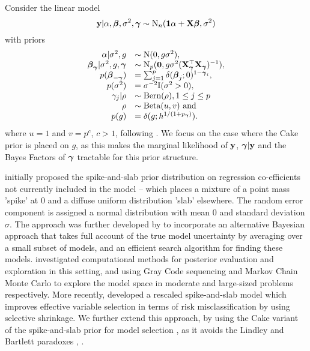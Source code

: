Consider the linear model
$$
	{\bf y} | \alpha, {\boldsymbol \beta}, \sigma^2, {\boldsymbol \gamma} \sim \text{N}_n({\bf 1} \alpha + {\bf X} {\boldsymbol \beta}, \sigma^2)
$$
with priors
$$
\begin{array}{rl}
	\alpha | \sigma^2, g &\sim \text{N}(0, g \sigma^2), \\
	{\boldsymbol \beta}_{\boldsymbol \gamma} | \sigma^2, g, {\boldsymbol \gamma} &\sim \text{N}_p({\bf 0}, g \sigma^2 ({\bf X}_{\boldsymbol \gamma}^\top {\bf X}_{\boldsymbol \gamma})^{-1}), \\
	p({\boldsymbol \beta}_{-{\boldsymbol \gamma}}) &= \sum_{j=1}^p \delta({\boldsymbol \beta}_j; 0)^{1 - {\boldsymbol \gamma}_i}, \\
	p(\sigma^2) &= \sigma^{-2} \text{I}(\sigma^2 > 0), \\
	\gamma_j | \rho &\sim \text{Bern}(\rho), 1 \leq j \leq p \\
	\rho &\sim \text{Beta}(u, v) \text{ and } \\
	p(g) &= \delta(g; h^{1/(1 + p_{\boldsymbol \gamma})}). \\
\end{array}
$$
where $u = 1$ and $v = p^c$, $c > 1$, following \cite{Castillo2015}.
We focus on the case where the Cake prior is placed on $g$, as this makes the marginal likelihood of ${\bf y}$,
${\boldsymbol \gamma} | {\bf y}$ and the Bayes Factors of ${\boldsymbol \gamma}$ tractable for this prior structure.


\cite{Mitchell1988} initially proposed the spike-and-slab prior distribution on regression co-efficients not
currently included in the model -- which places a mixture of a point mass 'spike' at $0$ and a diffuse uniform
distribution 'slab' elsewhere. The random error component is assigned a normal distribution with mean $0$ and
standard deviation $\sigma$. The approach was further developed by \cite{Madigan1994} to incorporate an
alternative Bayesian approach that takes full account of the true model uncertainty by averaging over a small
subset of models, and an efficient search algorithm for finding these models. \cite{George1997} investigated
computational methods for posterior evaluation and exploration in this setting, and using Gray Code sequencing
and Markov Chain Monte Carlo to explore the model space in moderate and large-sized problems respectively.
More recently, \cite{Ishwaran2005} developed a rescaled spike-and-slab model which improves effective variable
selection in terms of risk misclassification by using selective shrinkage. We further extend this approach, by
using the Cake variant of the spike-and-slab prior for model selection \cite{OrmerodEtal2017}, as it avoids
the Lindley and Bartlett paradoxes \cite{Lindley1957}, \cite{Bartlett1957}.

